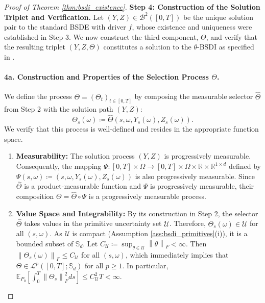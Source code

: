 \documentclass[12pt, letterpaper]{amsart}
\newcommand{\Ucal}{\mathcal{U}}
\newcommand{\Bcal}{\mathcal{B}}
\newcommand{\Lcalp}[1]{\mathcal{L}^{#1}}
\newcommand{\Sd}{\mathbb{S}_d}
\newcommand{\R}{\mathbb{R}}
\newcommand{\norm}[1]{\left\lVert#1\right\rVert}
\theoremstyle{plain}
\theoremstyle{definition}
\theoremstyle{remark}
\numberwithin{equation}{section} %
\begin{document}
\begin{proof}[Proof of Theorem \ref{thm:bsdi_existence}]
\vspace{1ex}
\noindent\textbf{Step 4: Construction of the Solution Triplet and Verification.}
Let $(Y,Z) \in \Bcal^2([0,T])$ be the unique solution pair to the standard BSDE with driver $f$, whose existence and uniqueness were established in Step 3. We now construct the third component, $\Theta$, and verify that the resulting triplet $(Y,Z,\Theta)$ constitutes a solution to the $\theta$-BSDI as specified in .

\paragraph{\textbf{4a. Construction and Properties of the Selection Process $\Theta$.}}
We define the process $\Theta = (\Theta_t)_{t\in[0,T]}$ by composing the measurable selector $\hat{\Theta}$ from Step 2 with the solution path $(Y,Z)$:
\begin{equation}
    \Theta_s(\omega) \coloneqq \hat{\Theta}(s, \omega, Y_s(\omega), Z_s(\omega)).
\end{equation}
We verify that this process is well-defined and resides in the appropriate function space.
\begin{enumerate}[label=(\roman*)]
    \item \textbf{Measurability:} The solution process $(Y,Z)$ is progressively measurable. Consequently, the mapping $\Psi: [0,T]\times\Omega \to [0,T]\times\Omega\times\R\times\R^{1\times d}$ defined by $\Psi(s,\omega) \coloneqq (s, \omega, Y_s(\omega), Z_s(\omega))$ is also progressively measurable. Since $\hat{\Theta}$ is a product-measurable function and $\Psi$ is progressively measurable, their composition $\Theta = \hat{\Theta} \circ \Psi$ is a progressively measurable process.
    \item \textbf{Value Space and Integrability:} By its construction in Step 2, the selector $\hat{\Theta}$ takes values in the primitive uncertainty set $\Ucal$. Therefore, $\Theta_s(\omega) \in \Ucal$ for all $(s,\omega)$. As $\Ucal$ is compact (Assumption \ref{ass:bsdi_primitives}(i)), it is a bounded subset of $\Sd$. Let $C_\Ucal \coloneqq \sup_{\theta \in \Ucal} \norm{\theta}_F < \infty$. Then $\norm{\Theta_s(\omega)}_F \le C_\Ucal$ for all $(s,\omega)$, which immediately implies that $\Theta \in \Lcalp{p}([0,T];\Sd)$ for all $p \ge 1$. In particular, $\mathbb{E}_{P_0}[\int_0^T \norm{\Theta_s}_F^2 ds] \le C_\Ucal^2 T < \infty$.
\end{enumerate}


\end{proof}
\end{document}
